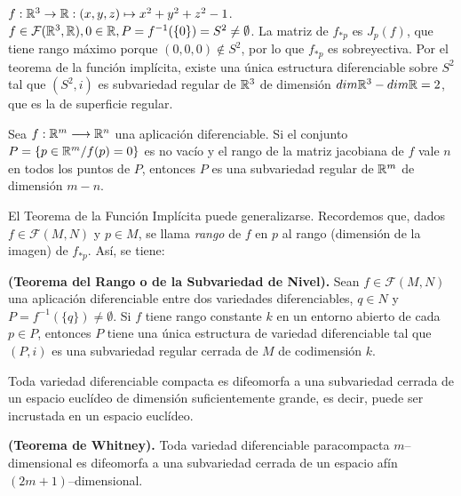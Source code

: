 \documentclass[Cursovd_portada.tex]{subfiles}
\begin{document}
\begin{ej}
$f:\mathbb{R}^3\to\mathbb{R}:(x,y,z)\mapsto x^2+y^2+z^2-1$. $f\in\mathcal{F}(\mathbb{R}^3,\mathbb{R}), 0\in\mathbb{R}, P=f^{-1}(\{0\})=S^2\neq\emptyset$. La matriz de $f_{*p}$ es $J_p(f)$, que tiene rango máximo porque $(0,0,0)\notin S^2$, por lo que $f_{*p}$ es sobreyectiva. Por el teorema de la función implícita, existe una única estructura diferenciable sobre $S^2$ tal que $(S^2,i)$ es subvariedad regular de $\mathbb{R}^3$ de dimensión $dim\mathbb{R}^3-dim\mathbb{R}=2$, que es la de superficie regular.
\end{ej}

\begin{coro} Sea $f:\mathbb{R}^m\longrightarrow\mathbb{R}^n$ una aplicación
diferenciable. Si el conjunto $P=\{p\in\mathbb{R}^m/f(p)=0\}$ es no
vacío y el rango de la matriz jacobiana de $f$ vale $n$ en
todos los puntos de $P$, entonces $P$ es una subvariedad regular
de $\mathbb{R}^m$ de dimensión $m-n$.
\end{coro}

\newpage

El Teorema de la Función Implícita puede generalizarse.
Recordemos que, dados $f\in \mathcal{F}(M,N)$ y $p \in M$, se
llama {\it rango} de $f$ en $p$ al rango (dimensión de la
imagen) de $f_{*p}$. Así, se tiene:

\begin{teorema}
{\bf (Teorema del Rango o de la Subvariedad de Nivel).} Sean
$f\in\mathcal{F}(M,N)$ una aplicación diferenciable entre dos
variedades diferenciables, $q\in N$ y
$P=f^{-1}(\{q\})\neq\emptyset$. Si $f$ tiene rango constante $k$
en un entorno abierto de cada $p\in P$, entonces $P$ tiene una
única estructura de variedad diferenciable tal que $(P,i)$ es
una subvariedad regular cerrada de $M$ de codimensión $k$.
\end{teorema}

\begin{teorema}
Toda variedad diferenciable compacta es difeomorfa a una subvariedad cerrada de un espacio euclídeo de dimensión
suficientemente grande, es decir, puede ser incrustada en un espacio euclídeo.
\end{teorema}
\begin{teorema}
{\bf (Teorema de Whitney).} Toda variedad diferenciable paracompacta $m$--dimensional es difeomorfa a una
subvariedad cerrada de un espacio afín $(2m+1)$--dimensional.
\end{teorema}
\end{document}
